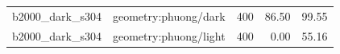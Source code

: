 \begin{longtable}{l>{\raggedright\arraybackslash}p{.42\linewidth}rrr}
b2000\_\allowbreak{}dark\_\allowbreak{}s304 & %
geometry:phuong/dark & %
400 & %
86.50 & %
99.55 \\ %

b2000\_\allowbreak{}dark\_\allowbreak{}s304 & %
geometry:phuong/light & %
400 & %
0.00 & %
55.16 \\ %


\end{longtable}
